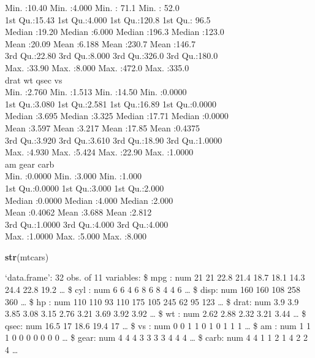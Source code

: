 \documentclass[12pt,openright,oneside,a4paper,chapter=TITLE,section=TITLE,subsection=Title,english,french,spanish,portugues,sumario=tradicional]{04-class-files/abntex2}
\newenvironment{Shaded}{\begin{snugshade}}{\end{snugshade}}
\newcommand{\KeywordTok}[1]{\textcolor[rgb]{0.13,0.29,0.53}{\textbf{#1}}}
\newcommand{\NormalTok}[1]{#1}
\begin{document}
Min. :10.40 Min. :4.000 Min. : 71.1 Min. : 52.0\\
1st Qu.:15.43 1st Qu.:4.000 1st Qu.:120.8 1st Qu.: 96.5\\
Median :19.20 Median :6.000 Median :196.3 Median :123.0\\
Mean :20.09 Mean :6.188 Mean :230.7 Mean :146.7\\
3rd Qu.:22.80 3rd Qu.:8.000 3rd Qu.:326.0 3rd Qu.:180.0\\
Max. :33.90 Max. :8.000 Max. :472.0 Max. :335.0\\
drat wt qsec vs\\
Min. :2.760 Min. :1.513 Min. :14.50 Min. :0.0000\\
1st Qu.:3.080 1st Qu.:2.581 1st Qu.:16.89 1st Qu.:0.0000\\
Median :3.695 Median :3.325 Median :17.71 Median :0.0000\\
Mean :3.597 Mean :3.217 Mean :17.85 Mean :0.4375\\
3rd Qu.:3.920 3rd Qu.:3.610 3rd Qu.:18.90 3rd Qu.:1.0000\\
Max. :4.930 Max. :5.424 Max. :22.90 Max. :1.0000\\
am gear carb\\
Min. :0.0000 Min. :3.000 Min. :1.000\\
1st Qu.:0.0000 1st Qu.:3.000 1st Qu.:2.000\\
Median :0.0000 Median :4.000 Median :2.000\\
Mean :0.4062 Mean :3.688 Mean :2.812\\
3rd Qu.:1.0000 3rd Qu.:4.000 3rd Qu.:4.000\\
Max. :1.0000 Max. :5.000 Max. :8.000

\begin{Shaded}
\begin{Highlighting}[]
\KeywordTok{str}\NormalTok{(mtcars)}
\end{Highlighting}
\end{Shaded}

`data.frame': 32 obs. of 11 variables:
\$ mpg : num 21 21 22.8 21.4 18.7 18.1 14.3 24.4 22.8 19.2 \ldots{}
\$ cyl : num 6 6 4 6 8 6 8 4 4 6 \ldots{}
\$ disp: num 160 160 108 258 360 \ldots{}
\$ hp : num 110 110 93 110 175 105 245 62 95 123 \ldots{}
\$ drat: num 3.9 3.9 3.85 3.08 3.15 2.76 3.21 3.69 3.92 3.92 \ldots{}
\$ wt : num 2.62 2.88 2.32 3.21 3.44 \ldots{}
\$ qsec: num 16.5 17 18.6 19.4 17 \ldots{}
\$ vs : num 0 0 1 1 0 1 0 1 1 1 \ldots{}
\$ am : num 1 1 1 0 0 0 0 0 0 0 \ldots{}
\$ gear: num 4 4 4 3 3 3 3 4 4 4 \ldots{}
\$ carb: num 4 4 1 1 2 1 4 2 2 4 \ldots{}
\end{document}
